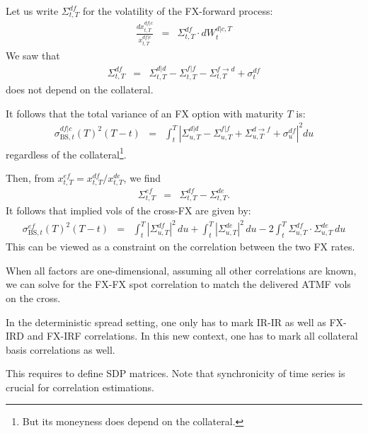 \documentclass[11pt,english]{amsart}
\newcommand{\BS}{\mathrm{BS}}
\theoremstyle{definition}
\newtheorem{coro}{Corrolary}
\begin{document}
Let us write $\Sigma^{df}_{t,T}$ for the volatility of the FX-forward process:
\begin{eqnarray}
  \frac{dx^{df|c}_{t,T}}{x^{df|c}_{t,T}} &=& \Sigma^{df}_{t,T} \cdot dW^{d|c,T}_{t} 
\end{eqnarray}
We saw that 
\begin{eqnarray}
  \Sigma^{df}_{t,T} &=& \Sigma^{d|d}_{t,T} - \Sigma^{f|f}_{t,T} - \Sigma^{f\to d}_{t,T}  + \sigma^{df}_t  
\end{eqnarray}
does not depend on the collateral. 

It follows that the total variance of an FX option with maturity $T$ is:
\begin{eqnarray}
  \sigma^{df|c}_{\BS,t}(T)^2  (T-t)
  &=& \int_t^T \left| \Sigma^{d|d}_{u,T} - \Sigma^{f|f}_{u,T} +\Sigma^{d\to f}_{u,T}  + \sigma^{df}_u  \right|^2 du
\end{eqnarray}
regardless of the collateral\footnote{But its moneyness does depend on the collateral.}.



Then, from $x^{ef}_{t,T} = x^{df}_{t,T}/x^{de}_{t,T}$, we find 
\begin{eqnarray}
  \Sigma^{ef}_{t,T} &=& \Sigma^{df}_{t,T}  - \Sigma^{de}_{t,T}  .
\end{eqnarray}
It follows that implied vols of the cross-FX are given by:
\begin{eqnarray}
  \sigma^{ef}_{\BS,t}(T)^2  (T-t)
  &=& \int_t^T \left| \Sigma^{df}_{u,T}  \right|^2 \, du
+ \int_t^T \left| \Sigma^{de}_{u,T}  \right|^2 \, du
- 2 \int_t^T \Sigma^{df}_{u,T} \cdot \Sigma^{de}_{u,T} \,du 
\end{eqnarray}
This can be viewed as a constraint on the correlation between the two FX rates. 

When all factors are one-dimensional, assuming all other correlations are known, we can solve for the FX-FX spot correlation to match the delivered ATMF vols on the cross.


In the deterministic spread setting, one only has to mark IR-IR as well as FX-IRD and FX-IRF correlations. In this new context, one has to mark all collateral basis correlations as well. 

This requires to define SDP matrices. 
Note that synchronicity of time series is crucial for correlation estimations.
\end{document}
